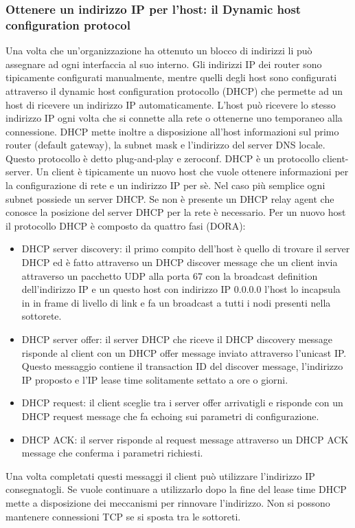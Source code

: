 \subsubsection{Ottenere un indirizzo IP per l'host: il Dynamic host configuration protocol}
Una volta che un'organizzazione ha ottenuto un blocco di indirizzi li pu\`o assegnare ad ogni interfaccia al suo interno. Gli indirizzi IP dei router sono
tipicamente configurati manualmente, mentre quelli degli host sono configurati attraverso il dynamic host configuration protocollo (DHCP) che permette ad un
host di ricevere un indirizzo IP automaticamente. L'host pu\`o ricevere lo stesso indirizzo IP ogni volta che si connette alla rete o ottenerne uno
temporaneo alla connessione. DHCP mette inoltre a disposizione all'host informazioni sul primo router (default gateway), la subnet mask e l'indirizzo del
server DNS locale. Questo protocollo \`e detto plug-and-play e zeroconf. DHCP \`e un protocollo client-server. Un client \`e tipicamente un nuovo host che
vuole ottenere informazioni per la configurazione di rete e un indirizzo IP per s\`e. Nel caso pi\`u semplice ogni subnet possiede un server DHCP. Se non 
\`e presente un DHCP relay agent che conosce la posizione del server DHCP per la rete \`e necessario. Per un nuovo host il protocollo DHCP \`e composto da
quattro fasi (DORA): 
\begin{itemize}
\item DHCP server discovery: il primo compito dell'host \`e quello di trovare il server DHCP ed \`e fatto attraverso un DHCP discover message che un client
invia attraverso un pacchetto UDP alla porta 67 con la broadcast definition dell'indirizzo IP e un questo host con indirizzo IP 0.0.0.0 l'host lo incapsula
in in frame di livello di link e fa un broadcast a tutti i nodi presenti nella sottorete.
\item DHCP server offer: il server DHCP che riceve il DHCP discovery message risponde al client con un DHCP offer message inviato attraverso l'unicast IP. 
Questo messaggio contiene il transaction ID del discover message, l'indirizzo IP proposto e l'IP lease time solitamente settato a ore o giorni. 
\item DHCP request: il client sceglie tra i server offer arrivatigli e risponde con un DHCP request message che fa echoing sui parametri di configurazione.
\item DHCP ACK: il server risponde al request message attraverso un DHCP ACK message che conferma i parametri richiesti. 
\end{itemize}
Una volta completati questi messaggi il client pu\`o utilizzare l'indirizzo IP consegnatogli. Se vuole continuare a utilizzarlo dopo la fine del lease time
DHCP mette a disposizione dei meccanismi per rinnovare l'indirizzo. Non si possono mantenere connessioni TCP se si sposta tra le sottoreti. 
